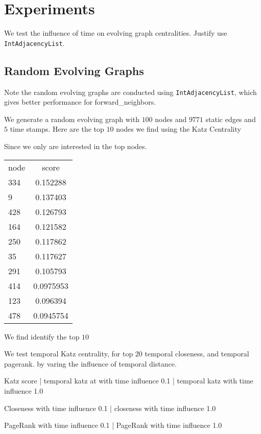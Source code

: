\documentclass[12pt]{article}
\theoremstyle{definition}
\begin{document}
\section{Experiments}
\label{sec:experiments}

We test the influence of time on evolving graph centralities.
Justify use \texttt{IntAdjacencyList}.


\subsection{Random Evolving Graphs}
\label{sec:random}

Note the random evolving graphs are conducted using \texttt{IntAdjacencyList}, which gives better performance for
forward\_neighbors.

We generate a random evolving graph with $100$ nodes and $9771$ static edges and $5$ time stamps.
Here are the top $10$ nodes we find using the Katz Centrality

Since we only are interested in the top nodes.

\begin{tabular}{ l | c }
  \hline
  node & score \\
  334 & 0.152288 \\
  9 & 0.137403 \\
  428 & 0.126793 \\
  164 & 0.121582 \\
  250 & 0.117862 \\
  35 & 0.117627 \\
  291 & 0.105793 \\
  414 & 0.0975953 \\
  123 & 0.096394 \\
  478 & 0.0945754 \\
  \hline
\end{tabular}



We find identify the top $10$

We test temporal Katz centrality,  for top $20$
temporal closeness, and temporal pagerank.
by varing the influence of temporal distance.



Katz score | temporal katz at with time influence 0.1 | temporal katz with time influence 1.0


Closeness with time influence 0.1 | closeness with time influence 1.0


PageRank with time influence 0.1 | PageRank with time influence 1.0
\end{document}
